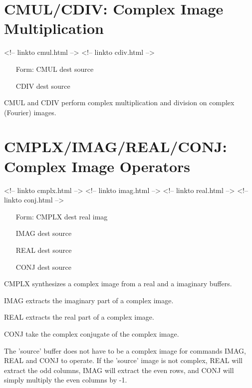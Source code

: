 \section{CMUL/CDIV: Complex Image Multiplication}
\begin{rawhtml}
<!-- linkto cmul.html -->
<!-- linkto cdiv.html -->
\end{rawhtml}
\begin{itemize}
  \item[Form: CMUL dest source\hfill]{}
  \item[CDIV dest source\hfill]{}
\end{itemize}

CMUL and CDIV perform complex multiplication and division on complex
(Fourier) images.

\section{CMPLX/IMAG/REAL/CONJ: Complex Image Operators}
\begin{rawhtml}
<!-- linkto cmplx.html -->
<!-- linkto imag.html -->
<!-- linkto real.html -->
<!-- linkto conj.html -->
\end{rawhtml}
\begin{itemize}
  \item[Form: CMPLX dest real imag\hfill]{}
  \item[IMAG dest source\hfill]{}
  \item[REAL dest source\hfill]{}
  \item[CONJ dest source\hfill]{}
\end{itemize}

CMPLX synthesizes a complex image from a real and a imaginary buffers.  

IMAG extracts the imaginary part of a complex image.  

REAL extracts the real part of a complex image.  

CONJ take the complex conjugate of the complex image.

The 'source' buffer does not have to be a complex image for commands IMAG,
REAL and CONJ to operate. If the 'source' image is not complex, REAL will
extract the odd columns, IMAG will extract the even rows, and CONJ will
simply multiply the even columns by -1.








